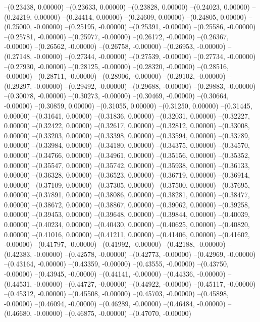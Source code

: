 --(0.23438, 0.00000)
--(0.23633, 0.00000)
--(0.23828, 0.00000)
--(0.24023, 0.00000)
--(0.24219, 0.00000)
--(0.24414, 0.00000)
--(0.24609, 0.00000)
--(0.24805, 0.00000)
--(0.25000, -0.00000)
--(0.25195, -0.00000)
--(0.25391, -0.00000)
--(0.25586, -0.00000)
--(0.25781, -0.00000)
--(0.25977, -0.00000)
--(0.26172, -0.00000)
--(0.26367, -0.00000)
--(0.26562, -0.00000)
--(0.26758, -0.00000)
--(0.26953, -0.00000)
--(0.27148, -0.00000)
--(0.27344, -0.00000)
--(0.27539, -0.00000)
--(0.27734, -0.00000)
--(0.27930, -0.00000)
--(0.28125, -0.00000)
--(0.28320, -0.00000)
--(0.28516, -0.00000)
--(0.28711, -0.00000)
--(0.28906, -0.00000)
--(0.29102, -0.00000)
--(0.29297, -0.00000)
--(0.29492, -0.00000)
--(0.29688, -0.00000)
--(0.29883, -0.00000)
--(0.30078, -0.00000)
--(0.30273, -0.00000)
--(0.30469, -0.00000)
--(0.30664, -0.00000)
--(0.30859, 0.00000)
--(0.31055, 0.00000)
--(0.31250, 0.00000)
--(0.31445, 0.00000)
--(0.31641, 0.00000)
--(0.31836, 0.00000)
--(0.32031, 0.00000)
--(0.32227, 0.00000)
--(0.32422, 0.00000)
--(0.32617, 0.00000)
--(0.32812, 0.00000)
--(0.33008, 0.00000)
--(0.33203, 0.00000)
--(0.33398, 0.00000)
--(0.33594, 0.00000)
--(0.33789, 0.00000)
--(0.33984, 0.00000)
--(0.34180, 0.00000)
--(0.34375, 0.00000)
--(0.34570, 0.00000)
--(0.34766, 0.00000)
--(0.34961, 0.00000)
--(0.35156, 0.00000)
--(0.35352, 0.00000)
--(0.35547, 0.00000)
--(0.35742, 0.00000)
--(0.35938, 0.00000)
--(0.36133, 0.00000)
--(0.36328, 0.00000)
--(0.36523, 0.00000)
--(0.36719, 0.00000)
--(0.36914, 0.00000)
--(0.37109, 0.00000)
--(0.37305, 0.00000)
--(0.37500, 0.00000)
--(0.37695, 0.00000)
--(0.37891, 0.00000)
--(0.38086, 0.00000)
--(0.38281, 0.00000)
--(0.38477, 0.00000)
--(0.38672, 0.00000)
--(0.38867, 0.00000)
--(0.39062, 0.00000)
--(0.39258, 0.00000)
--(0.39453, 0.00000)
--(0.39648, 0.00000)
--(0.39844, 0.00000)
--(0.40039, 0.00000)
--(0.40234, 0.00000)
--(0.40430, 0.00000)
--(0.40625, 0.00000)
--(0.40820, 0.00000)
--(0.41016, 0.00000)
--(0.41211, 0.00000)
--(0.41406, 0.00000)
--(0.41602, -0.00000)
--(0.41797, -0.00000)
--(0.41992, -0.00000)
--(0.42188, -0.00000)
--(0.42383, -0.00000)
--(0.42578, -0.00000)
--(0.42773, -0.00000)
--(0.42969, -0.00000)
--(0.43164, -0.00000)
--(0.43359, -0.00000)
--(0.43555, -0.00000)
--(0.43750, -0.00000)
--(0.43945, -0.00000)
--(0.44141, -0.00000)
--(0.44336, -0.00000)
--(0.44531, -0.00000)
--(0.44727, -0.00000)
--(0.44922, -0.00000)
--(0.45117, -0.00000)
--(0.45312, -0.00000)
--(0.45508, -0.00000)
--(0.45703, -0.00000)
--(0.45898, -0.00000)
--(0.46094, -0.00000)
--(0.46289, -0.00000)
--(0.46484, -0.00000)
--(0.46680, -0.00000)
--(0.46875, -0.00000)
--(0.47070, -0.00000)
